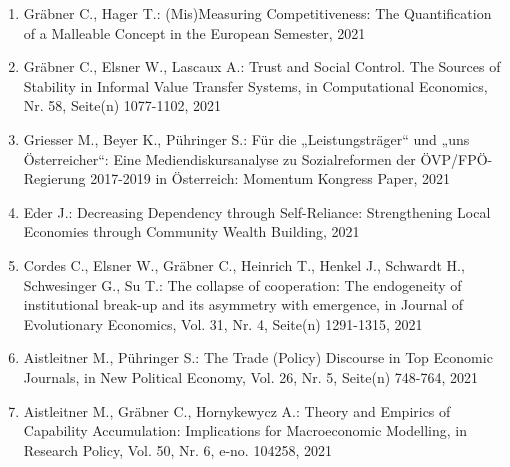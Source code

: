 \begin{enumerate}
	 \item Gräbner C., Hager T.: (Mis)Measuring Competitiveness:  The Quantification of a Malleable Concept in the European Semester, 2021
	 \item Gräbner C., Elsner W., Lascaux A.: Trust and Social Control. The Sources of Stability in Informal Value Transfer Systems, in Computational Economics, Nr. 58, Seite(n) 1077-1102, 2021
	 \item Griesser M., Beyer K., Pühringer S.: Für die „Leistungsträger“ und „uns Österreicher“: Eine Mediendiskursanalyse zu Sozialreformen der ÖVP/FPÖ-Regierung 2017-2019 in Österreich: Momentum Kongress Paper, 2021
	 \item Eder J.: Decreasing Dependency through Self-Reliance: Strengthening Local Economies through Community Wealth Building, 2021
	 \item Cordes C., Elsner W., Gräbner C., Heinrich T., Henkel J., Schwardt H., Schwesinger G., Su T.: The collapse of cooperation: The endogeneity of institutional break-up and its asymmetry with emergence, in Journal of Evolutionary Economics, Vol. 31, Nr. 4, Seite(n) 1291-1315, 2021
	 \item Aistleitner M., Pühringer S.: The Trade (Policy) Discourse in Top Economic Journals, in New Political Economy, Vol. 26, Nr. 5, Seite(n) 748-764, 2021
	 \item Aistleitner M., Gräbner C., Hornykewycz A.: Theory and Empirics of Capability Accumulation: Implications for Macroeconomic Modelling, in Research Policy, Vol. 50, Nr. 6, e-no. 104258, 2021
\end{enumerate}
